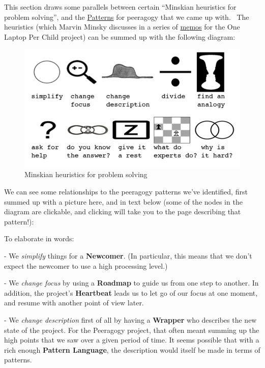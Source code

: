 This section draws some parallels between certain ``Minskian heuristics
for problem solving'', and the
\href{http://peeragogy.org/patterns-usecases/}{Patterns} for peeragogy
that we came up with.~ The heuristics (which Marvin Minsky discusses in
a series of
\href{http://web.media.mit.edu/~minsky/OLPC-1.html}{m}\href{http://web.media.mit.edu/~minsky/OLPC-2.html}{e}\href{http://web.media.mit.edu/~minsky/OLPC-3.html}{m}\href{http://web.media.mit.edu/~minsky/OLPC-4.html}{o}\href{http://web.media.mit.edu/~minsky/OLPC-5.html}{s}
for the One Laptop Per Child project) can be summed up with the
following diagram:

\begin{figure}[htbp]
\centering
\includegraphics[width=\textwidth]{./pictures/heuristic-images.jpg}
\caption{Minskian heuristics for problem solving}
\end{figure}

We can see some relationships to the peeragogy patterns we've
identified, first summed up with a picture here, and in text below (some
of the nodes in the diagram are clickable, and clicking will take you to
the page describing that pattern!):

To elaborate in words:

- We \emph{simplify} things for a \textbf{Newcomer}. (In particular,
this means that we don't expect the newcomer to use a high processing
level.)

- We \emph{change focus} by using a \textbf{Roadmap} to guide us from
one step to another. In addition, the project's \textbf{Heartbeat} leads
us to let go of our focus at one moment, and resume with another point
of view later.

- We \emph{change description} first of all by having a \textbf{Wrapper}
who describes the new state of the project. For the Peeragogy project,
that often meant summing up the high points that we saw over a given
period of time. It seems possible that with a rich enough
\textbf{Pattern Language}, the description would itself be made in terms
of patterns.

